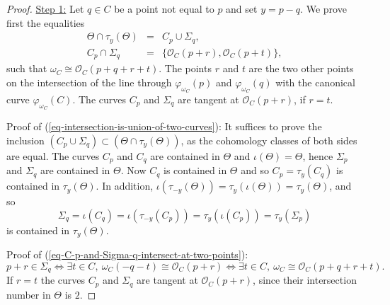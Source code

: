 \documentclass[12pt]{amsart}
\numberwithin{equation}{subsection}
\theoremstyle{plain}
\theoremstyle{definition}
\newcommand{\StructureSheaf}[1]{{\mathcal O}_{#1}}
\begin{document}
\begin{proof}
\underline{Step 1:}
Let $q\in C$ be a point not equal to $p$ and set $y=p-q$. We prove first the equalities
\begin{eqnarray}
\label{eq-intersection-is-union-of-two-curves}
\Theta\cap \tau_y(\Theta)&=&C_p\cup \Sigma_q,
\\
\label{eq-C-p-and-Sigma-q-intersect-at-two-points}
C_p\cap\Sigma_q&=&\{\StructureSheaf{C}(p+r),\StructureSheaf{C}(p+t)\},
\end{eqnarray}
such that $\omega_C\cong\StructureSheaf{C}(p+q+r+t)$. The points $r$ and $t$ are the two other points on the intersection of the line through $\varphi_{\omega_C}(p)$ and $\varphi_{\omega_C}(q)$ with the canonical curve $\varphi_{\omega_C}(C)$. The curves $C_p$ and $\Sigma_q$ are tangent at $\StructureSheaf{C}(p+r)$, if $r=t$. 

Proof of (\ref{eq-intersection-is-union-of-two-curves}):
It suffices to prove the inclusion $(C_p\cup \Sigma_q)\subset (\Theta\cap \tau_y(\Theta))$, as the cohomology classes of both sides are equal. 
The curves $C_p$ and $C_q$ are contained in $\Theta$ and  $\iota(\Theta)=\Theta$, hence $\Sigma_p$ and $\Sigma_q$ are  contained in $\Theta$.
Now $C_q$ is contained in $\Theta$ and so $C_p=\tau_y(C_q)$ is contained in $\tau_y(\Theta)$. 
In addition, $\iota(\tau_{-y}(\Theta))=\tau_y(\iota(\Theta))=\tau_y(\Theta)$, and so 
\begin{equation}
\label{eq-Sigma-q-is-translate-of-Sigma-p-by-p-q}
\Sigma_q=\iota(C_q)=\iota(\tau_{-y}(C_p))=\tau_y(\iota(C_p))=\tau_y(\Sigma_p)
\end{equation}
is contained in  $\tau_y(\Theta).$

Proof of (\ref{eq-C-p-and-Sigma-q-intersect-at-two-points}):
\[
p+r\in\Sigma_q\Leftrightarrow \exists t\in C, \ \omega_C(-q-t)\cong\StructureSheaf{C}(p+r)
\Leftrightarrow 
\exists t\in C, \  \omega_C\cong\StructureSheaf{C}(p+q+r+t).
\]
If $r=t$ the curves $C_p$ and $\Sigma_q$ are tangent at $\StructureSheaf{C}(p+r)$, since their intersection number in $\Theta$ is $2$.


\end{proof}
\end{document}
